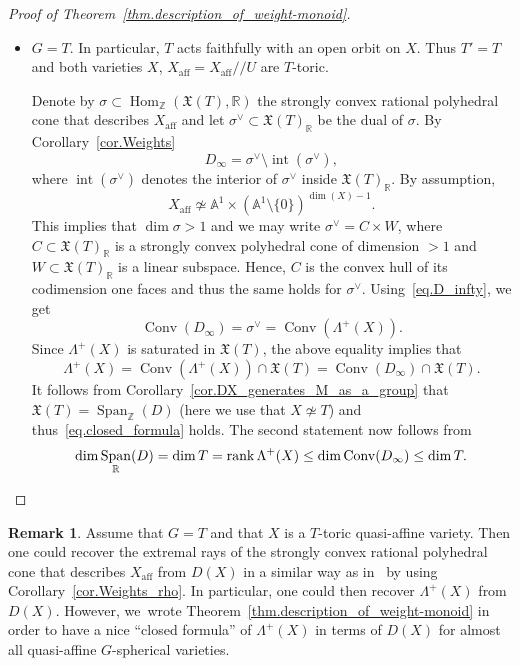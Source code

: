 \documentclass[11pt]{article}
\numberwithin{equation}{section}
\let\oldvee\vee
\renewcommand{\vee}{{\scriptscriptstyle\oldvee}}
\theoremstyle{plain}
\theoremstyle{definition}
\newtheorem{remark}[theorem]{Remark}
\DeclareMathOperator{\Hom}{Hom}
\DeclareMathOperator{\rank}{rank}
\DeclareMathOperator{\aff}{aff}
\DeclareMathOperator{\Conv}{Conv}
\DeclareMathOperator{\Span}{Span}
\DeclareMathOperator{\inter}{int}
\newcommand{\RR}{\mathbb{R}}
\newcommand{\ZZ}{\mathbb{Z}}
\renewcommand{\AA}{\mathbb{A}}
\newcommand{\aquot}{/ \! \! /}
\begin{document}
\begin{proof}[Proof of Theorem~\ref{thm.description_of_weight-monoid}]
\begin{itemize}
\item $G = T$. In particular, $T$ acts faithfully with an open orbit on $X$. Thus
$T' = T$ and both varieties $X$, $X_{\aff} = X_{\aff} \aquot U$ are $T$-toric.

Denote by $\sigma \subset \Hom_{\ZZ}(\mathfrak{X}(T), \RR)$ the strongly convex
rational polyhedral cone that describes $X_{\aff}$ and let
$\sigma^\vee \subset \mathfrak{X}(T)_{\RR}$ be the dual of $\sigma$.
By Corollary~\ref{cor.Weights}
\[
\label{eq.D_infty}
\tag{$\triangle$}
D_{\infty} = \sigma^\vee \setminus \inter(\sigma^\vee),
\]
where $\inter(\sigma^\vee)$ denotes the interior of $\sigma^\vee$ inside $\mathfrak{X}(T)_{\RR}$.
By assumption,
\[
X_{\aff} \not\simeq \AA^1 \times (\AA^1 \setminus \{0\})^{\dim(X)-1}.
\]
This implies that
$\dim \sigma > 1$ and we may write $\sigma^\vee = C \times W$, where
$C \subset \mathfrak{X}(T)_\RR$
is a strongly convex polyhedral cone of dimension $> 1$
and $W \subset \mathfrak{X}(T)_\RR$ is a linear subspace.
Hence, $C$ is the convex hull of its codimension one faces and thus the same holds
for $\sigma^\vee$. Using~\eqref{eq.D_infty}, we get
\[
\Conv(D_{\infty}) = \sigma^\vee = \Conv(\Lambda^+(X)).
\]
Since $\Lambda^+(X)$ is saturated in $\mathfrak{X}(T)$, the above equality implies that
\[
\Lambda^+(X) = \Conv(\Lambda^+(X)) \cap \mathfrak{X}(T) =
\Conv(D_\infty) \cap \mathfrak{X}(T).
\]
It follows from Corollary~\ref{cor.DX_generates_M_as_a_group} that
$\mathfrak{X}(T) = \Span_{\ZZ}(D)$ (here we use that $X \not\simeq T$)
and thus~\eqref{eq.closed_formula} holds. The second statement now follows from
\[
\dim \Span_{\RR}(D) = \dim T = \rank \Lambda^+(X) \leq
\dim \Conv(D_\infty) \leq \dim T.\qedhere
\]
\end{itemize}
\end{proof}

\begin{remark}
Assume that $G = T$ and that $X$ is a $T$-toric quasi-affine variety.
Then one could recover the extremal rays of the strongly convex rational polyhedral
cone that describes $X_{\aff}$ from $D(X)$ in a similar
way as in~\cite[Lem.\,6.11]{LiReUr2018Characterization-o} by using Corollary~\ref{cor.Weights_rho}.
In particular, one could then recover $\Lambda^+(X)$ from $D(X)$.
However, we~wrote Theorem~\ref{thm.description_of_weight-monoid} in order to have a nice
``closed formula''
of $\Lambda^+(X)$ in terms of $D(X)$ for almost all quasi-affine $G$-spherical varieties.
\end{remark}
\end{document}
